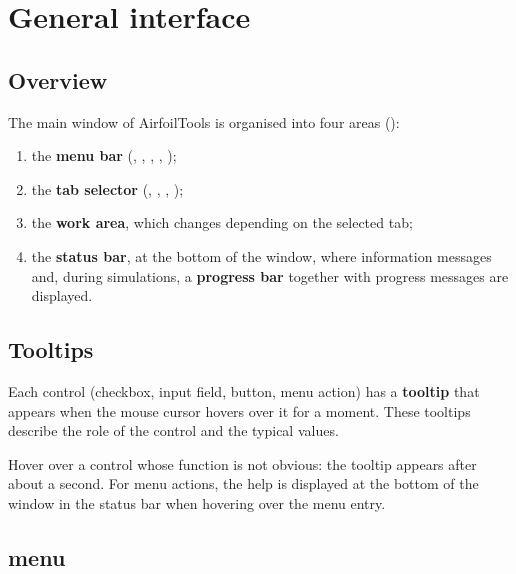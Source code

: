 \chapter{General interface}
\label{chap:interface}

\section{Overview}

The main window of AirfoilTools is organised into four
areas ():

\begin{enumerate}
    \item the \textbf{menu bar} (, ,
        , , );
    \item the \textbf{tab selector} (,
        , ,
        );
    \item the \textbf{work area}, which changes depending on the
        selected tab;
    \item the \textbf{status bar}, at the bottom of the window, where
        information messages and, during simulations, a
        \textbf{progress bar} together with progress messages are
        displayed.
\end{enumerate}

\section{Tooltips}

Each control (checkbox, input field, button, menu action)
has a \textbf{tooltip} that appears when the mouse
cursor hovers over it for a moment. These tooltips describe the role
of the control and the typical values.

\begin{astuce}
Hover over a control whose function is not obvious:
the tooltip appears after about a second.
For menu actions, the help is displayed at the bottom of
the window in the status bar when hovering over the
menu entry.
\end{astuce}

\section{ menu}

